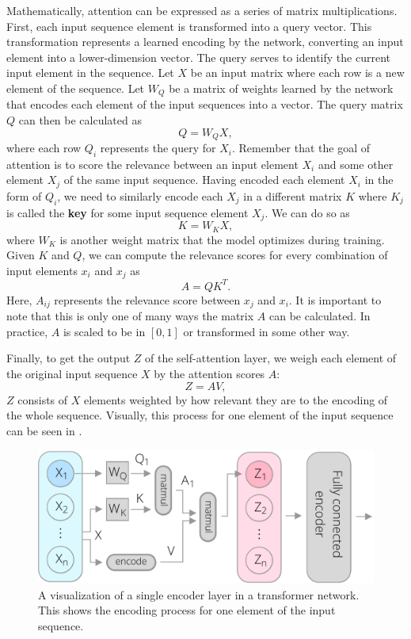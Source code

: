 Mathematically, attention can be expressed as a series of matrix multiplications. First, each input sequence element is transformed into a query vector. This transformation represents a learned encoding by the network, converting an input element into a lower-dimension vector. The query serves to identify the current input element in the sequence. Let $X$ be an input matrix where each row is a new element of the sequence. Let $W_Q$ be a matrix of weights learned by the network that encodes each element of the input sequences into a vector. The query matrix $Q$ can then be calculated as
\begin{equation}
Q = W_Q X,
\end{equation}
where each row $Q_i$ represents the query for $X_i$. Remember that the goal of attention is to score the relevance between an input element $X_i$ and some other element $X_j$ of the same input sequence. Having encoded each element $X_i$ in the form of $Q_i$, we need to similarly encode each $X_j$ in a different matrix $K$ where $K_j$ is called the \textbf{key} for some input sequence element $X_j$. We can do so as
\begin{equation}
K = W_K X,
\end{equation}
where $W_K$ is another weight matrix that the model optimizes during training. Given $K$ and $Q$, we can compute the relevance scores for every combination of input elements $x_i$ and $x_j$ as
\begin{equation}
A = Q K^T.
\end{equation}
Here, $A_{ij}$ represents the relevance score between $x_j$ and $x_i$. It is important to note that this is only one of many ways the matrix $A$ can be calculated. In practice, $A$ is scaled to be in $[0, 1]$ or transformed in some other way.

Finally, to get the output $Z$ of the self-attention layer, we weigh each element of the original input sequence $X$ by the attention scores $A$:
\begin{equation}
Z = A V,
\end{equation}
$Z$ consists of $X$ elements weighted by how relevant they are to the encoding of the whole sequence. Visually, this process for one element of the input sequence can be seen in .

 \begin{figure}[t!]
 \centering
 \includegraphics[width=0.8\linewidth]{images/attention-explainer}
 \caption{A visualization of a single encoder layer in a transformer network. This shows the encoding process for one element of the input sequence.}
 \label{fig:attention-explainer}
 \end{figure}
 
